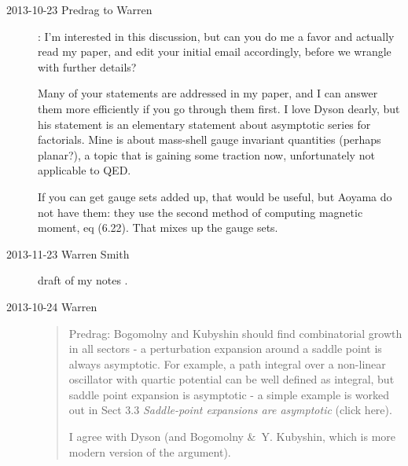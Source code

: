 \begin{description}
\item[2013-10-23 Predrag to Warren]:
I'm interested in this discussion, but can you do me a
favor and actually read my paper, and edit your initial email
accordingly, before we wrangle with further details?

Many of your statements are addressed in my paper, and I can answer them
more efficiently if you go through them first. I love Dyson dearly, but
his statement is an elementary statement about asymptotic series for
factorials. Mine is about mass-shell gauge invariant quantities (perhaps
planar?), a topic that is gaining some traction now, unfortunately not
applicable to QED.

If you can get gauge sets added up, that would be useful, but Aoyama
\etal{} do not have them: they  use the second
method of computing magnetic moment,
{eq (6.22)}. That mixes up the gauge sets.



\item[2013-11-23 Warren Smith]
 {draft of my notes} .

\item[2013-10-24 Warren]
\begin{quote} Predrag:
   Bogomolny and Kubyshin should find combinatorial growth
   in all sectors - a perturbation expansion around a saddle point is
   always asymptotic. For example, a path integral over a non-linear
   oscillator with quartic potential can be well defined as integral, but
   saddle point expansion is asymptotic - a simple example is worked out
   in Sect 3.3 {\em Saddle-point expansions are asymptotic}
    {(click
   here)}.

   I agree with Dyson (and Bogomolny \&\ Y. Kubyshin, which is more
   modern version of the argument).
\end{quote}


\end{description}
